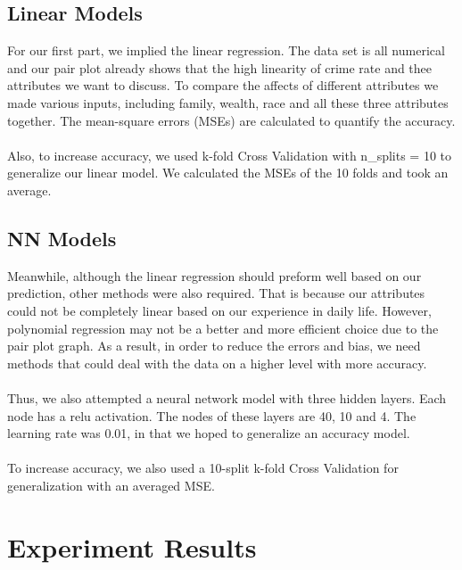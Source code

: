 \documentclass[letterpaper, 11 pt, conference]{article}
\begin{document}
\subsection{Linear Models}
For our first part, we implied the linear regression. The data set is all numerical and our pair plot already shows that the high linearity of crime rate and thee attributes we want to discuss. To compare the affects of different attributes we made various inputs, including family, wealth, race and all these three attributes together. The mean-square errors (MSEs) are calculated to quantify the accuracy.
\\
\\Also, to increase accuracy, we used k-fold Cross Validation with n\_splits = 10 to generalize our linear model. We calculated the MSEs of the 10 folds and took an average.


\subsection{NN Models}
Meanwhile, although the linear regression should preform well based on our prediction, other methods were also required. That is because our attributes could not be completely linear based on our experience in daily life. However, polynomial regression may not be a better and more efficient choice due to the pair plot graph. As a result, in order to reduce the errors and bias, we need methods that could deal with the data on a higher level with more accuracy.
\\
\\Thus, we also attempted a neural network model with three hidden layers. Each node has a relu activation. The nodes of these layers are 40, 10 and 4. The learning rate was 0.01, in that we hoped to generalize an accuracy model.
\\
\\To increase accuracy, we also used a 10-split k-fold Cross Validation for generalization with an averaged MSE.





\section{Experiment Results}
\end{document}
